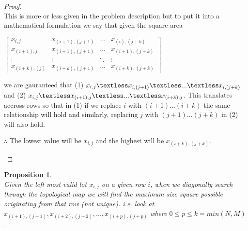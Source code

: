 \documentclass[12pt]{article}
\newtheorem{proposition}[theorem]{Proposition}
\begin{document}
\begin{proof}
~ \\ \indent This is more or less given in the problem description but to put it into a mathematical formulation we say that given
the square area
\begin{center}$
\begin{bmatrix}
    x_{i,j}          & x_{(i+1),(j+1)} & \dots  & x_{(i),(j+k)}     \\
    x_{(i+1),j}      & x_{(i+1),(j+1)} & \dots  & x_{(i+1),(j+k)}   \\
    \vdots           & \vdots          & \ddots & \vdots            \\
    x_{(i+k),(j)}    & x_{(i+k),(j+1)} & \dots  & x_{(i+k),(j+k)}
\end{bmatrix}
$\end{center}
we are gauranteed that (1) $x_{i,j} \textless x_{i,(j+1)} \textless ... \textless x_{i,(j+k)}$
and (2) $x_{i,j} \textless x_{(i+1),j} \textless ... \textless x_{(i+k),j}$.  This translates
accross rows so that in (1) if we replace $i$ with $(i+1)...(i+k)$ the same relationship will hold
and similarly, replacing $j$ with $(j+1)...(j+k)$ in (2) will also hold.
\begin{center}$\therefore$ The lowest value will be $x_{i,j}$ and the highest will be $x_{(i+k),(j+k)}$.\end{center}
\end{proof}

\begin{proposition}
~ \\ \indent Given the left most valid lot $x_{i,j}$ on a given row $i$, when we diagonally search through the topological map
we will find the maximum size square possible originating from that row (not unique). i.e. look at $x_{(i+1),(j+1)}
,x_{(i+2),(j+2)},...,x_{(i+p),(j+p)}$ where $0 \leq p \leq k = min(N,M)$.
\end{proposition}
\end{document}
